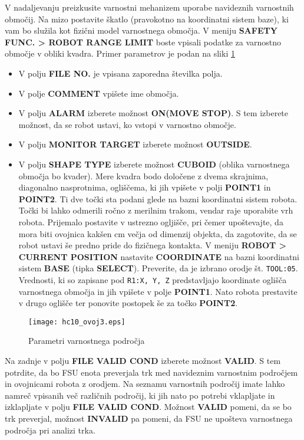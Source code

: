 V nadaljevanju preizkusite varnostni mehanizem uporabe navideznih varnostnih območij. Na mizo postavite škatlo (pravokotno na koordinatni sistem baze), ki vam bo služila kot fizični model varnostnega območja. V meniju \textbf{SAFETY FUNC. > ROBOT RANGE LIMIT} boste vpisali podatke za varnostno območje v obliki kvadra. Primer parametrov je podan na sliki \ref{fig:hc10_ovoj3}
\begin{itemize}
	\item V polju \textbf{FILE NO.} je vpisana zaporedna številka polja.
	\item V polje \textbf{COMMENT} vpišete ime območja.
	\item V polju \textbf{ALARM} izberete možnost \textbf{ON(MOVE STOP)}. S tem izberete možnost, da se robot ustavi, ko vstopi v varnostno območje.
	\item V polju \textbf{MONITOR TARGET} izberete možnost \textbf{OUTSIDE}.
	\item V polju \textbf{SHAPE TYPE} izberete možnost \textbf{CUBOID} (oblika varnostnega območja bo kvader). Mere kvadra bodo določene z dvema skrajnima, diagonalno nasprotnima,  ogliščema, ki jih vpišete v polji  \textbf{POINT1} in \textbf{POINT2}. Ti dve točki sta podani glede na bazni koordinatni sistem robota. Točki bi lahko odmerili ročno z merilnim trakom, vendar raje uporabite vrh robota. Prijemalo postavite v ustrezno ogljišče, pri čemer upoštevajte, da mora biti ovojnica kakšen cm večja od dimenzij objekta, da zagotovite, da se robot ustavi še predno pride do fizičnega kontakta. V meniju \textbf{ROBOT > CURRENT POSITION} nastavite \textbf{COORDINATE} na bazni koordinatni sistem \textbf{BASE} (tipka \textbf{SELECT}). Preverite, da je izbrano orodje št. \verb"TOOL:05". Vrednosti, ki so zapisane pod \verb"R1:X, Y, Z" predstavljajo koordinate oglišča varnostnega območja in jih vpišete v polje \textbf{POINT1}. Nato robota prestavite v drugo oglišče ter ponovite postopek še za točko \textbf{POINT2}.
\end{itemize}

\begin{figure}[!hbt]
	\centering
	\texttt{[image: hc10\_ovoj3.eps]}
	\caption{Parametri varnostnega področja}
	\label{fig:hc10_ovoj3}
\end{figure}

Na zadnje v polju \textbf{FILE VALID COND} izberete možnost \textbf{VALID}. S tem potrdite, da bo FSU enota preverjala trk med navideznim varnostnim področjem in ovojnicami robota z orodjem. Na seznamu varnostnih področij imate lahko namreč vpisanih več različnih področij, ki jih nato po potrebi vklapljate in izklapljate  v polju \textbf{FILE VALID COND}. Možnost \textbf{VALID} pomeni, da se bo trk preverjal, možnost \textbf{INVALID} pa pomeni, da FSU ne upošteva varnostnega področja pri analizi trka.

